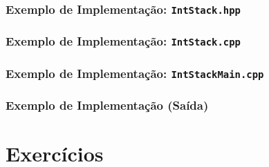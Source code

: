 \documentclass[aspectratio=169]{beamer}
\begin{document}
\begin{frame}\frametitle{Exemplo de Implementação: \texttt{IntStack.hpp}}

\end{frame}

\begin{frame}\frametitle{Exemplo de Implementação: \texttt{IntStack.cpp}}
\fontsize{3pt}{5pt}\selectfont{

}
\end{frame}
	
\begin{frame}\frametitle{Exemplo de Implementação: \texttt{IntStackMain.cpp}}
\fontsize{5pt}{6pt}\selectfont{

}
\end{frame}
\begin{frame}\frametitle{Exemplo de Implementação (Saída)}

\end{frame}

\section{Exercícios}
\end{document}
